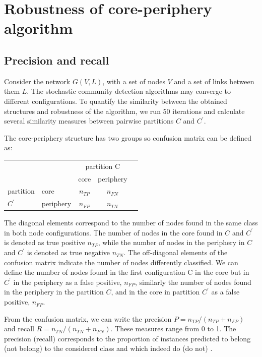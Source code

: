 \chapter{Robustness of core-periphery algorithm} %
\section{Precision and recall}
Consider the network $G(V, L)$, with a set of nodes $V$ and a set of links between them $L$. The stochastic community detection algorithms may converge to different configurations. To quantify the similarity between the obtained structures and robustness of the algorithm, we run 50 iterations and calculate several similarity measures between pairwise partitions $C$ and $C^{'}$.

The core-periphery structure has two groups so confusion matrix \cite{labatut2012accuracy} can be defined as:

\begin{center}
	
	\begin{tabular}{l|l|c|c|c} 
		
		\multicolumn{2}{c}{}&\multicolumn{2}{c}{partition C}&\\ 
		
		\cline{3-4} 
		\multicolumn{2}{c|}{}&core&periphery&\multicolumn{1}{c}{}\\
		\cline{2-4} 
		partition & core & $n_{TP}$ & $n_{FN}$ & \\ 
		\cline{2-4} $C^{'}$ & periphery & $n_{FP}$ & $n_{TN}$ & \\ 
		\cline{2-4}
	\end{tabular}
\end{center}

The diagonal elements correspond to the number of nodes found in the same class in both node configurations. The number of nodes in the core found in $C$ and $C^{'}$ is denoted as true positive $n_{TP}$, while the number of nodes in the periphery in $C$ and $C^{'}$ is denoted as true negative $n_{TN}$. The off-diagonal elements of the confusion matrix indicate the number of nodes differently classified. We can define the number of nodes found in the first configuration C in the core but in $C^{'}$ in the periphery as a false positive, $n_{FP}$, similarly the number of nodes found in the periphery in the partition $C$, and in the core in partition $C^{'}$ as a false positive, $n_{FP}$. 

From the confusion matrix, we can write the precision $P =n_{TP}/(n_{TP}+n_{FP})$ and recall $R=n_{TN}/(n_{TN}+n_{FN})$. These measures range from 0 to 1. The precision (recall) corresponds to the proportion of instances predicted to belong (not belong) to the considered class and which indeed do (do not) \cite{labatut2012accuracy}. \\~\\

